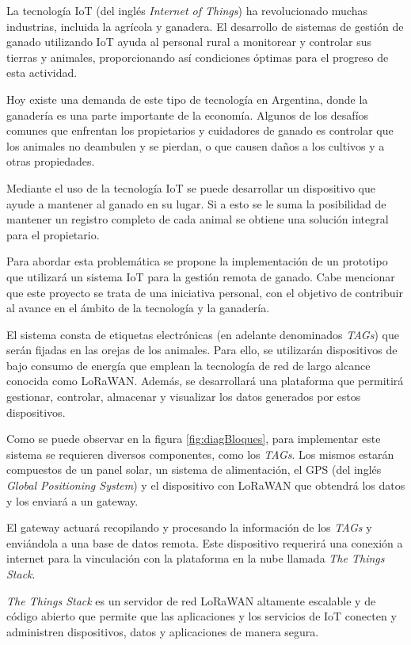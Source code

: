 \documentclass[
11pt, %
]{charter}
\begin{document}
La tecnología IoT (del inglés \emph{Internet of Things}) ha revolucionado muchas industrias, incluida la agrícola y ganadera. El desarrollo de sistemas de gestión de ganado utilizando IoT ayuda al personal rural a monitorear y controlar sus tierras y animales, proporcionando así condiciones óptimas para el progreso de esta actividad.

Hoy existe una demanda de este tipo de tecnología en Argentina, donde la ganadería es una parte importante de la economía. Algunos de los desafíos comunes que enfrentan los propietarios y cuidadores de ganado es controlar que los animales no deambulen y se pierdan, o que causen daños a los cultivos y a otras propiedades.

Mediante el uso de la tecnología IoT se puede desarrollar un dispositivo que ayude a mantener al ganado en su lugar. Si a esto se le suma la posibilidad de mantener un registro completo de cada animal se obtiene una solución integral para el propietario.

Para abordar esta problemática se propone la implementación de un prototipo que utilizará un sistema IoT para la gestión remota de ganado. Cabe mencionar que este proyecto se trata de una iniciativa personal, con el objetivo de contribuir al avance en el ámbito de la tecnología y la ganadería.

El sistema consta de etiquetas electrónicas (en adelante denominados \emph{TAGs}) que serán fijadas en las orejas de los animales. Para ello, se utilizarán dispositivos de bajo consumo de energía que emplean la tecnología de red de largo alcance conocida como LoRaWAN. Además, se desarrollará una plataforma que permitirá gestionar, controlar, almacenar y visualizar los datos generados por estos dispositivos.

Como se puede observar en la figura \ref{fig:diagBloques}, para implementar este sistema se requieren diversos componentes, como los \emph{TAGs}. Los mismos estarán compuestos de un panel solar, un sistema de alimentación, el GPS (del inglés \emph{Global Positioning System}) y el dispositivo con LoRaWAN que obtendrá los datos y los enviará a un gateway. 

El gateway actuará recopilando y procesando la información de los \emph{TAGs} y enviándola a una base de datos remota. Este dispositivo requerirá una conexión a internet para la vinculación con la plataforma en la nube llamada \emph{The Things Stack}.

\emph{The Things Stack} es un servidor de red LoRaWAN altamente escalable y de código abierto que permite que las aplicaciones y los servicios de IoT conecten y administren dispositivos, datos y aplicaciones de manera segura. 
\end{document}
